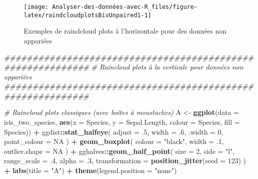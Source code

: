 \documentclass[
  french,
]{book}
\newenvironment{Shaded}{\begin{snugshade}}{\end{snugshade}}
\newcommand{\CommentTok}[1]{\textcolor[rgb]{0.56,0.35,0.01}{\textit{#1}}}
\newcommand{\DataTypeTok}[1]{\textcolor[rgb]{0.13,0.29,0.53}{#1}}
\newcommand{\DecValTok}[1]{\textcolor[rgb]{0.00,0.00,0.81}{#1}}
\newcommand{\FloatTok}[1]{\textcolor[rgb]{0.00,0.00,0.81}{#1}}
\newcommand{\KeywordTok}[1]{\textcolor[rgb]{0.13,0.29,0.53}{\textbf{#1}}}
\newcommand{\NormalTok}[1]{#1}
\newcommand{\OperatorTok}[1]{\textcolor[rgb]{0.81,0.36,0.00}{\textbf{#1}}}
\newcommand{\OtherTok}[1]{\textcolor[rgb]{0.56,0.35,0.01}{#1}}
\newcommand{\StringTok}[1]{\textcolor[rgb]{0.31,0.60,0.02}{#1}}
\begin{document}
\begin{figure}

{\centering \texttt{[image: Analyser-des-données-avec-R\_files/figure-latex/raindcloudplotsBivUnpaired1-1]} 

}

\caption{Exemples de raindcloud plots à l'horizontale pour des données non appariées}\label{fig:raindcloudplotsBivUnpaired1}
\end{figure}

\begin{Shaded}
\begin{Highlighting}[]
\CommentTok{###########################################################}
\CommentTok{# Raincloud plots à la verticale pour données non appariées}
\CommentTok{###########################################################}

\CommentTok{# Raincloud plots classiques (avec boîtes à moustaches)}
\NormalTok{A <-}
\StringTok{  }\KeywordTok{ggplot}\NormalTok{(}\DataTypeTok{data =}\NormalTok{ iris_two_species, }
         \KeywordTok{aes}\NormalTok{(}\DataTypeTok{x =}\NormalTok{ Species, }\DataTypeTok{y =}\NormalTok{ Sepal.Length, }\DataTypeTok{colour =}\NormalTok{ Species, }\DataTypeTok{fill =}\NormalTok{ Species)) }\OperatorTok{+}
\StringTok{  }\NormalTok{ggdist}\OperatorTok{::}\KeywordTok{stat_halfeye}\NormalTok{(}
    \DataTypeTok{adjust =} \FloatTok{.5}\NormalTok{, }
    \DataTypeTok{width =} \FloatTok{.6}\NormalTok{, }
    \DataTypeTok{.width =} \DecValTok{0}\NormalTok{, }
    \DataTypeTok{point_colour =} \OtherTok{NA}
\NormalTok{    ) }\OperatorTok{+}
\StringTok{  }\KeywordTok{geom_boxplot}\NormalTok{(}
    \DataTypeTok{colour =} \StringTok{"black"}\NormalTok{,}
    \DataTypeTok{width =} \FloatTok{.1}\NormalTok{, }
    \DataTypeTok{outlier.shape =} \OtherTok{NA}
\NormalTok{  ) }\OperatorTok{+}
\StringTok{  }\NormalTok{gghalves}\OperatorTok{::}\KeywordTok{geom_half_point}\NormalTok{(}
    \DataTypeTok{size =} \DecValTok{2}\NormalTok{, }
    \DataTypeTok{side =} \StringTok{"l"}\NormalTok{, }
    \DataTypeTok{range_scale =} \FloatTok{.4}\NormalTok{, }
    \DataTypeTok{alpha =} \FloatTok{.3}\NormalTok{,}
    \DataTypeTok{transformation =} \KeywordTok{position_jitter}\NormalTok{(}\DataTypeTok{seed =} \DecValTok{123}\NormalTok{)}
\NormalTok{  ) }\OperatorTok{+}
\StringTok{  }\KeywordTok{labs}\NormalTok{(}\DataTypeTok{title =} \StringTok{"A"}\NormalTok{) }\OperatorTok{+}
\StringTok{  }\KeywordTok{theme}\NormalTok{(}\DataTypeTok{legend.position =} \StringTok{"none"}\NormalTok{)}



\end{Highlighting}
\end{Shaded}
\end{document}

